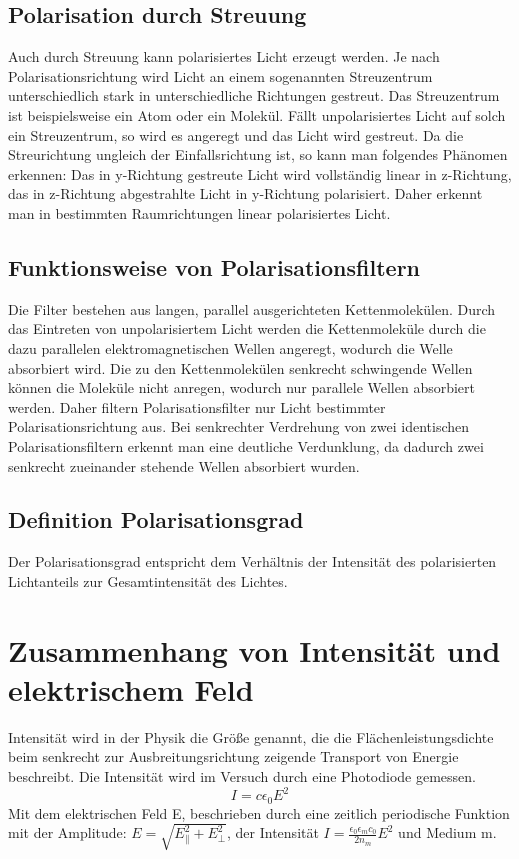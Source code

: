 \subsection*{Polarisation durch Streuung}
Auch durch Streuung kann polarisiertes Licht erzeugt werden. Je nach Polarisationsrichtung wird Licht an einem sogenannten Streuzentrum unterschiedlich stark in unterschiedliche Richtungen gestreut. Das Streuzentrum ist beispielsweise ein Atom oder ein Molekül. Fällt unpolarisiertes Licht auf solch ein Streuzentrum, so wird es angeregt und das Licht wird gestreut. Da die Streurichtung ungleich der Einfallsrichtung ist, so kann man folgendes Phänomen erkennen:  Das in y-Richtung gestreute Licht wird vollständig linear in z-Richtung, das in z-Richtung abgestrahlte Licht in y-Richtung polarisiert. Daher erkennt man in bestimmten Raumrichtungen linear polarisiertes Licht.

\subsection*{Funktionsweise von Polarisationsfiltern}
Die Filter bestehen aus langen, parallel ausgerichteten Kettenmolekülen. Durch das Eintreten von unpolarisiertem Licht werden die Kettenmoleküle durch die dazu parallelen elektromagnetischen Wellen angeregt, wodurch die Welle absorbiert wird. Die zu den Kettenmolekülen senkrecht schwingende Wellen können die Moleküle nicht anregen, wodurch nur parallele Wellen absorbiert werden. Daher filtern Polarisationsfilter nur Licht bestimmter Polarisationsrichtung aus. 
Bei senkrechter Verdrehung von zwei identischen Polarisationsfiltern erkennt man eine deutliche Verdunklung, da dadurch zwei senkrecht zueinander stehende Wellen absorbiert wurden. 

\subsection*{Definition Polarisationsgrad}
Der Polarisationsgrad entspricht dem Verhältnis der Intensität des polarisierten Lichtanteils zur Gesamtintensität des Lichtes.

\section{Zusammenhang von Intensität und elektrischem Feld}
Intensität wird in der Physik die Größe genannt, die die Flächenleistungsdichte beim senkrecht zur Ausbreitungsrichtung zeigende Transport von Energie beschreibt. 
Die Intensität wird im Versuch durch eine Photodiode gemessen. 
\begin{equation}
I=c\epsilon_0 E^2
\end{equation}
Mit dem elektrischen Feld E, beschrieben durch eine zeitlich periodische Funktion mit der Amplitude: $E=\sqrt{E_{\parallel}^2 +E^2_{\perp}}$, der Intensität $I=\frac{\epsilon_0\epsilon_mc_0}{2n_m}E^2$ und Medium m.



